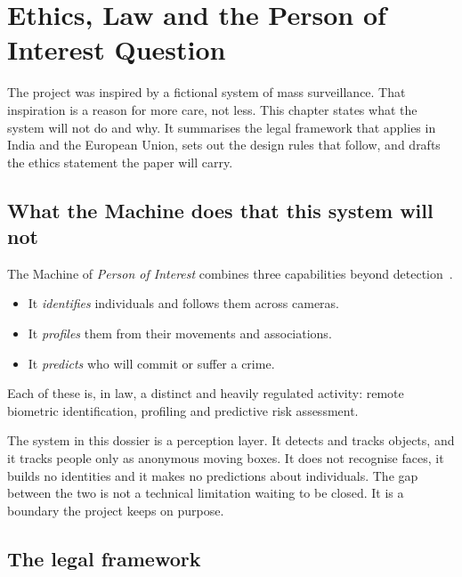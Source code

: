\chapter{Ethics, Law and the Person of Interest Question}
\label{ch:ethics}

The project was inspired by a fictional system of mass surveillance. That
inspiration is a reason for more care, not less. This chapter states what
the system will not do and why. It summarises the legal framework that
applies in India and the European Union, sets out the design rules that
follow, and drafts the ethics statement the paper will carry.

\section{What the Machine does that this system will not}

The Machine of \emph{Person of Interest} combines three capabilities beyond
detection~\citep{poi2011}.
\begin{itemize}
  \item It \emph{identifies} individuals and follows them across cameras.
  \item It \emph{profiles} them from their movements and associations.
  \item It \emph{predicts} who will commit or suffer a crime.
\end{itemize}
Each of these is, in law, a distinct and heavily regulated activity: remote
biometric identification, profiling and predictive risk assessment.

The system in this dossier is a perception layer. It detects and tracks
objects, and it tracks people only as anonymous moving boxes. It does not
recognise faces, it builds no identities and it makes no predictions about
individuals. The gap between the two is not a technical limitation waiting
to be closed. It is a boundary the project keeps on purpose.

\section{The legal framework}

